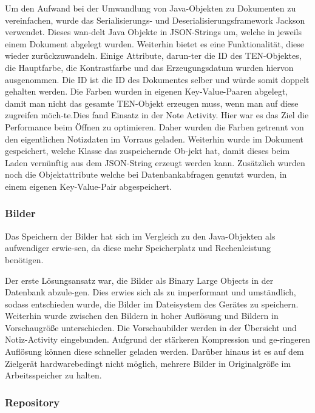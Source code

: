 Um den Aufwand bei der Umwandlung von Java-Objekten zu Dokumenten zu vereinfachen, wurde das Serialisierungs- und Deserialisierungsframework Jackson verwendet. Dieses wan-delt Java Objekte in JSON-Strings um, welche in jeweils einem Dokument abgelegt wurden. Weiterhin bietet es eine Funktionalität, diese wieder zurückzuwandeln. Einige Attribute, darun-ter die ID des TEN-Objektes, die Hauptfarbe, die Kontrastfarbe und das Erzeugungsdatum wurden hiervon ausgenommen. Die ID ist die ID des Dokumentes selber und würde somit doppelt gehalten werden. Die Farben wurden in eigenen Key-Value-Paaren abgelegt, damit man nicht das gesamte TEN-Objekt erzeugen muss, wenn man auf diese zugreifen möch-te.Dies fand Einsatz in der Note Activity. Hier war es das Ziel die Performance beim Öffnen zu optimieren. Daher wurden die Farben getrennt von den eigentlichen Notizdaten im Vorraus geladen. Weiterhin wurde im Dokument gespeichert, welche Klasse das zuspeichernde Ob-jekt hat, damit dieses beim Laden vernünftig aus dem JSON-String erzeugt werden kann. Zusätzlich wurden noch die Objektattribute welche bei Datenbankabfragen genutzt wurden, in einem eigenen Key-Value-Pair abgespeichert.

\subsubsection{Bilder}
Das Speichern der Bilder hat sich im Vergleich zu den Java-Objekten als aufwendiger erwie-sen, da diese mehr Speicherplatz und Rechenleistung benötigen.

Der erste Lösungsansatz war, die Bilder als Binary Large Objects in der Datenbank abzule-gen. Dies erwies sich als zu imperformant und umständlich, sodass entschieden wurde, die Bilder im Dateisystem des Gerätes zu speichern. Weiterhin wurde zwischen den Bildern in hoher Auflösung und Bildern in Vorschaugröße unterschieden. Die Vorschaubilder werden in der Übersicht und Notiz-Activity eingebunden. Aufgrund der stärkeren Kompression und ge-ringeren Auflösung können diese schneller geladen werden. Darüber hinaus ist es auf dem Zielgerät hardwarebedingt nicht möglich, mehrere Bilder in Originalgröße im Arbeitsspeicher zu halten.

\subsubsection{Repository}
